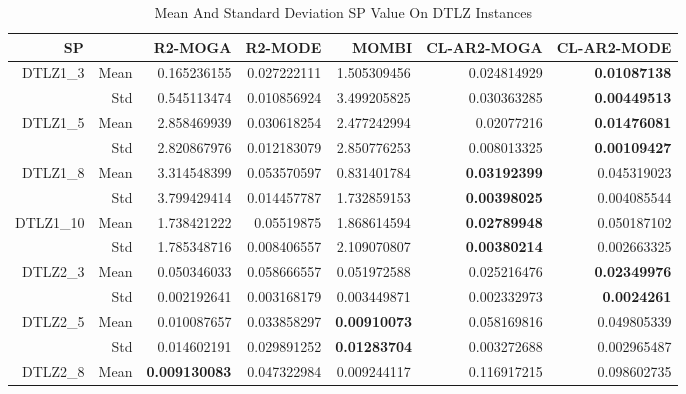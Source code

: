 \begin{table*}[htbp]
  \centering
  \caption{Mean And Standard Deviation SP Value On DTLZ Instances}
    \begin{tabular}{rrrrrrr}
    \toprule
    \multicolumn{2}{c}{SP} & R2-MOGA & R2-MODE & MOMBI & CL-AR2-MOGA & CL-AR2-MODE \\
    \midrule
    \multirow{2}[0]{*}{DTLZ1\_3} & Mean  & 0.165236155 & 0.027222111 & \multicolumn{1}{c}{1.505309456} & 0.024814929 & \textbf{0.01087138} \\
          & Std   & 0.545113474 & 0.010856924 & \multicolumn{1}{c}{3.499205825} & 0.030363285 & \textbf{0.00449513} \\
    \multirow{2}[0]{*}{DTLZ1\_5} & Mean  & 2.858469939 & 0.030618254 & \multicolumn{1}{c}{2.477242994} & 0.02077216 & \textbf{0.01476081} \\
          & Std   & 2.820867976 & 0.012183079 & \multicolumn{1}{c}{2.850776253} & 0.008013325 & \textbf{0.00109427} \\
    \multirow{2}[0]{*}{DTLZ1\_8} & Mean  & 3.314548399 & 0.053570597 & \multicolumn{1}{c}{0.831401784} & \textbf{0.03192399} & 0.045319023 \\
          & Std   & 3.799429414 & 0.014457787 & \multicolumn{1}{c}{1.732859153} & \textbf{0.00398025} & 0.004085544 \\
    \multirow{2}[0]{*}{DTLZ1\_10} & Mean  & 1.738421222 & 0.05519875 & \multicolumn{1}{c}{1.868614594} & \textbf{0.02789948} & 0.050187102 \\
          & Std   & 1.785348716 & 0.008406557 & \multicolumn{1}{c}{2.109070807} & \textbf{0.00380214} & 0.002663325 \\
    \multirow{2}[0]{*}{DTLZ2\_3} & Mean  & 0.050346033 & 0.058666557 & \multicolumn{1}{c}{0.051972588} & 0.025216476 & \textbf{0.02349976} \\
          & Std   & 0.002192641 & 0.003168179 & \multicolumn{1}{c}{0.003449871} & 0.002332973 & \textbf{0.0024261} \\
    \multirow{2}[0]{*}{DTLZ2\_5} & Mean  & 0.010087657 & 0.033858297 & \multicolumn{1}{c}{\textbf{0.00910073}} & 0.058169816 & 0.049805339 \\
          & Std   & 0.014602191 & 0.029891252 & \multicolumn{1}{c}{\textbf{0.01283704}} & 0.003272688 & 0.002965487 \\
    \multirow{2}[0]{*}{DTLZ2\_8} & Mean  & \textbf{0.009130083} & 0.047322984 & \multicolumn{1}{c}{0.009244117} & 0.116917215 & 0.098602735 \\

\end{tabular}
\end{table*}
